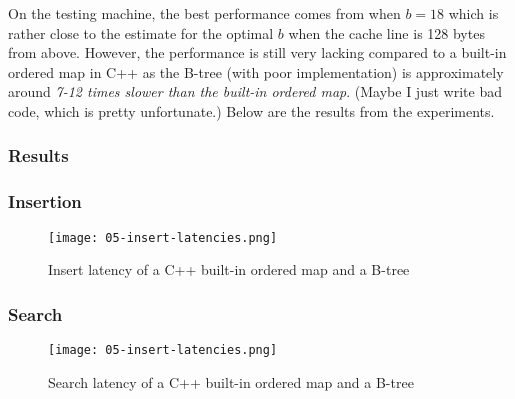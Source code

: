 On the testing machine, the best performance comes from when $b = 18$ which is rather close to the estimate for the optimal $b$ when the cache line is 128 bytes from above. However, the performance is still very lacking compared to a built-in ordered map in C++ as the B-tree (with poor implementation) is approximately around \textit{7-12 times slower than the built-in ordered map}. (Maybe I just write bad code, which is pretty unfortunate.) Below are the results from the experiments.

\subsubsection{Results}

\subsubsection*{Insertion}

\begin{figure}[H]
	\begin{center}
		\texttt{[image: 05-insert-latencies.png]}
		\caption{Insert latency of a C++ built-in ordered map and a B-tree}
		\label{fig:05-insert-latency}
	\end{center}
\end{figure}

\subsubsection*{Search}

\begin{figure}[H]
	\begin{center}
		\texttt{[image: 05-insert-latencies.png]}
		\caption{Search latency of a C++ built-in ordered map and a B-tree}
		\label{fig:05-search-latency}
	\end{center}
\end{figure}
